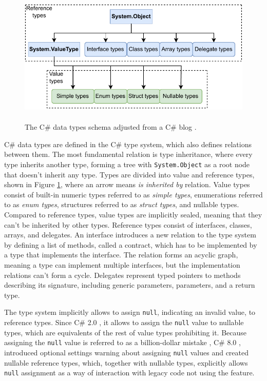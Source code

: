 \begin{figure}[b]
\centering
\includegraphics[width=140mm, height=65mm]{./img/CSTypeSystem.pdf}
\caption{The C\# data types schema adjusted from a C\# blog \cite{online:cSharpTypeSystem}.}
\label{img04:typeSys}
\end{figure}
C\# data types are defined in the C\# type system, which also defines relations between them. 
The most fundamental relation is type inheritance, where every type inherits another type, forming a tree with \texttt{System.Object} as a root node that doesn’t inherit any type.
Types are divided into value and reference types, shown in Figure \ref{img04:typeSys}, where an arrow means \textit{is inherited by} relation. 
Value types consist of built-in numeric types referred to as \textit{simple types}, enumerations referred to as \textit{enum types}, structures referred to as \textit{struct types}, and nullable types. 
Compared to reference types, value types are implicitly sealed, meaning that they can’t be inherited by other types. 
Reference types consist of interfaces, classes, arrays, and delegates. 
An interface introduces a new relation to the type system by defining a list of methods, called a contract, which has to be implemented by a type that implements the interface.
The relation forms an acyclic graph, meaning a type can implement multiple interfaces, but the implementation relations can’t form a cycle. 
Delegates represent typed pointers to methods describing its signature, including generic parameters, parameters, and a return type.
\par
The type system implicitly allows to assign \texttt{null}, indicating an invalid value, to reference types. Since C\# 2.0 \cite{online:csHist}, it allows to assign the \texttt{null} value to nullable types, which are equivalents of the rest of value types prohibiting it. Because assigning the \texttt{null} value is referred to as a billion-dollar mistake \cite{online:billionDolarMistake}, C\# 8.0 \cite{online:csHist}, introduced optional settings warning about assigning \texttt{null} values and created nullable reference types, which, together with nullable types, explicitly allows \texttt{null} assignment as a way of interaction with legacy code not using the feature.
